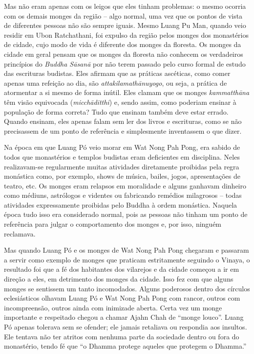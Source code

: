 Mas não eram apenas com os leigos que eles tinham problemas: o mesmo
ocorria com os demais monges da região -- algo normal, uma vez que os
pontos de vista de diferentes pessoas não são sempre iguais. Mesmo Luang
Pu Man, quando veio residir em Ubon Ratchathani, foi expulso da região
pelos monges dos monastérios de cidade, cujo modo de vida é diferente
dos monges da floresta. Os monges da cidade em geral pensam que os
monges da floresta não conhecem os verdadeiros princípios do
\emph{Buddha Sāsanā} por não terem passado pelo curso formal de estudo
das escrituras budistas. Eles afirmam que as práticas ascéticas, como
comer apenas uma refeição ao dia, são \emph{attakilamathānuyogo}, ou
seja, a prática de atormentar a si mesmo de forma inútil. Eles clamam
que os monges \emph{kammatthāna} têm visão equivocada
(\emph{micchāditthi}) e, sendo assim, como poderiam ensinar à população
de forma correta? Tudo que ensinam também deve estar errado. Quando
ensinam, eles apenas falam sem ler dos livros e escrituras, como se não
precisassem de um ponto de referência e simplesmente inventassem o que
dizer.

Na época em que Luang Pó veio morar em Wat Nong Pah Pong, era sabido de
todos que monastérios e templos budistas eram deficientes em disciplina.
Neles realizavam-se regularmente muitas atividades diretamente proibidas
pela regra monástica como, por exemplo, shows de música, bailes, jogos,
apresentações de teatro, etc. Os monges eram relapsos em moralidade e
alguns ganhavam dinheiro como médiuns, astrólogos e videntes ou
fabricando remédios milagrosos -- todas atividades expressamente
proibidas pelo Buddha à ordem monástica. Naquela época tudo isso era
considerado normal, pois as pessoas não tinham um ponto de referência
para julgar o comportamento dos monges e, por isso, ninguém reclamava.

Mas quando Luang Pó e os monges de Wat Nong Pah Pong chegaram e passaram
a servir como exemplo de monges que praticam estritamente seguindo o
Vinaya, o resultado foi que a fé dos habitantes dos vilarejos e da
cidade começou a ir em direção a eles, em detrimento dos monges da
cidade. Isso fez com que alguns monges se sentissem um tanto
incomodados. Alguns poderosos dentro dos círculos eclesiásticos olhavam
Luang Pó e Wat Nong Pah Pong com rancor, outros com incompreensão,
outros ainda com inimizade aberta. Certa vez um monge importante e
respeitado chegou a chamar Ajahn Chah de ``monge louco''. Luang Pó
apenas tolerava sem se ofender; ele jamais retaliava ou respondia aos
insultos. Ele tentava não ter atritos com nenhuma parte da sociedade
dentro ou fora do monastério, tendo fé que ``o Dhamma protege aqueles
que protegem o Dhamma.''

